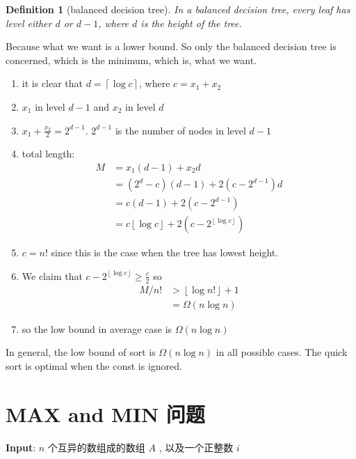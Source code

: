 \documentclass[a4paper, 10pt]{ctexart} %
\newtheorem{definition}{Definition}
\begin{document}
\begin{definition}[balanced decision tree]
In a balanced decision tree, every leaf has level either $d$ or $d - 1$, where $d$ is the 
height of the tree.
\end{definition}

Because what we want is a lower bound. So 
only the balanced decision tree is concerned,
which is the minimum, which is, what we want. 

\begin{enumerate}
    \item it is clear that $d = \left\lceil \log  c \right\rceil$, where $c = x_{1} + x_{2}$
    \item $x_{1}$ in level $d - 1$ and $x_{2} $ in level $d$
    \item $x_{1} + \frac{x_2}{2} = 2^{d-1}$. $2 ^{d- 1}$ is the number of nodes in 
    level $d  -1$
    \item total length:
    \begin{align*}
        M & = x _{1} \left(d - 1\right)  +x_{2} d  \\ 
        & = \left(2 ^{d} - c     \right) \left(d - 1\right) + 2 \left( c - 2 ^{d-1}\right) d\\
        & = c \left(d - 1\right) + 2 \left( c - 2 ^{d-1}\right) \tag{$d- 1  = \left\lfloor  \log c \right\rfloor$}\\
        & = c \left\lfloor \log  c \right\rfloor + 2 \left(c - 2 ^{\left\lfloor \log c \right\rfloor}\right)
    \end{align*}
    \item $c = n!$ since this is the case when the tree has lowest height. 
    \item We claim that $c  - 2 ^{\left\lfloor \log  c \right\rfloor } \ge \frac{c}{2}$ so 
    \begin{align*}
        M / n ! & > \left\lfloor \log n ! \right\rfloor + 1 \\
        & = \Omega \left( n \log  n\right)
    \end{align*}
    \item so the low bound in average case is $\Omega \left( n \log n\right)$
\end{enumerate}

In general, the low bound of sort is $\Omega \left( n\log n\right)$ in all possible cases.
The quick sort is optimal when the const is ignored.
\section{MAX and MIN 问题}
\noindent\textbf{Input}: $n$ 个互异的数组成的数组 $A$ , 以及一个正整数 $i$
\end{document}
